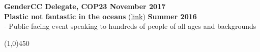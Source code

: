 \noindent \textbf{GenderCC Delegate, COP23 \hfill November 2017}	\\

\noindent \textbf{Plastic not fantastic in the oceans} (\href{https://bit.ly/2B3us5l}{link}) \hfill \textbf{Summer 2016}							\\
- Public-facing event speaking to hundreds of people of all ages and backgrounds

\begin{center} \line(1,0){450} \end{center}